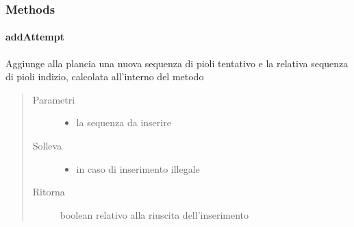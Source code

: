 \documentclass[letterpaper,10pt,italian]{sphinxmanual}
\begin{document}
\subsubsection{Methods}
\label{\detokenize{source/it/unicam/cs/pa/mastermind/gamecore/BoardModel:methods}}

\paragraph{addAttempt}
\label{\detokenize{source/it/unicam/cs/pa/mastermind/gamecore/BoardModel:addattempt}}

\begin{fulllineitems}
\label{\detokenize{source/it/unicam/cs/pa/mastermind/gamecore/BoardModel:it.unicam.cs.pa.mastermind.gamecore.BoardModel.addAttempt(List)}}
Aggiunge alla plancia una nuova sequenza di pioli tentativo e la relativa sequenza di pioli indizio, calcolata all’interno del metodo
\begin{quote}\begin{description}
\item[{Parametri}] \leavevmode\begin{itemize}
\item {} 
 \textendash{} la sequenza da inserire

\end{itemize}

\item[{Solleva}] \leavevmode\begin{itemize}
\item {} 
 \textendash{} in caso di inserimento illegale

\end{itemize}

\item[{Ritorna}] \leavevmode
boolean relativo alla riuscita dell’inserimento

\end{description}\end{quote}

\end{fulllineitems}
\end{document}
